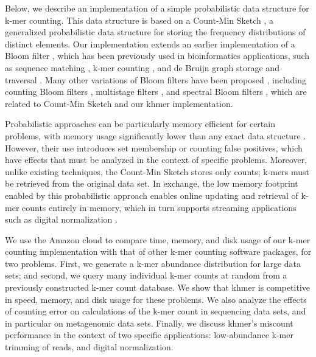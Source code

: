 \documentclass[10pt]{article}
\begin{document}

Below, we describe an implementation of a simple probabilistic data
structure for k-mer counting. This data structure is based on a
Count-Min Sketch \cite{Cormode2005} , a generalized probabilistic data structure for
storing the frequency distributions of distinct elements.
Our implementation extends an earlier
implementation of a Bloom filter \cite{Bloom70}, which has been previously used 
in bioinformatics applications, such as
sequence matching \cite{DBLP:conf/padl/MaldeO09}, k-mer counting \cite{Melsted2011}, 
and de Bruijn graph storage and traversal \cite{Pell2012,Jones:2012aa}.
Many other variations of Bloom filters have been proposed \cite{BroderM03}, including
counting Bloom filters \cite{Fan:2000:SCS:343571.343572}, 
multistage filters \cite{DBLP:conf/sigcomm/EstanV02}, 
and spectral Bloom filters \cite{DBLP:conf/sigmod/CohenM03}, which 
are related to Count-Min Sketch and our khmer implementation. 
 

Probabilistic approaches can be particularly memory efficient for
certain problems, with memory usage significantly lower than any exact
data structure \cite{Pell2012}.  However, their use introduces set
membership or counting false positives, which have effects that must
be analyzed in the context of specific problems.  Moreover, unlike
existing techniques, the Count-Min Sketch stores only counts; k-mers
must be retrieved from the original data set.  In exchange, the low
memory footprint enabled by this probabilistic approach enables online
updating and retrieval of k-mer counts entirely in memory, which in
turn supports streaming applications such as digital normalization
\cite{Brown2012}.

We use the Amazon cloud to compare time, memory, and disk usage of our
k-mer counting implementation with that of other k-mer counting software packages, 
for two problems. First, we generate a k-mer abundance
distribution for large data sets; and second, we query many individual
k-mer counts at random from a previously constructed k-mer count
database.  We show that khmer is competitive in speed, memory, and
disk usage for these problems.  We also analyze the effects of
counting error on calculations of the k-mer count in sequencing data
sets, and in particular on metagenomic data sets.  Finally, we discuss
khmer's miscount performance in the context of two specific
applications: low-abundance k-mer trimming of reads, and digital
normalization.
\end{document}

